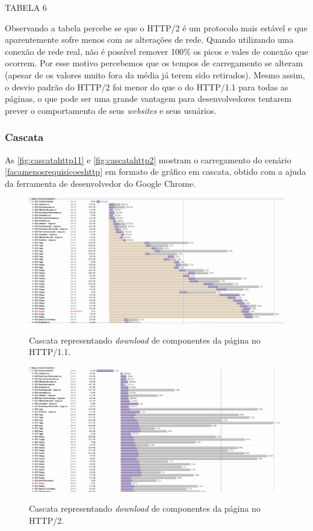 TABELA 6

Observando a tabela percebe se que o HTTP/2 é um protocolo mais estável e que aparentemente sofre menos com as alterações de rede. Quando utilizando uma conexão de rede real, não é possível remover 100\% os picos e vales de conexão que ocorrem. Por esse motivo percebemos que os tempos de carregamento se alteram (apesar de os valores muito fora da média já terem sido retirados). Mesmo assim, o desvio padrão do HTTP/2 foi menor do que o do HTTP/1.1 para todas as páginas, o que pode ser uma grande vantagem para desenvolvedores tentarem prever o comportamento de seus \textit{websites} e seus usuários.

\subsubsection{Cascata}
\label{cascata}

As \autoref{fig:cascatahttp11} e \autoref{fig:cascatahttp2} mostram o carregamento do cenário \autoref{facamenosrequisicoeshttp} em formato de gráfico em cascata, obtido com a ajuda da ferramenta de desenvolvedor do Google Chrome.

\begin{figure}[!htb]
    \centering
    \caption{Cascata representando \textit{download} de componentes da página no HTTP/1.1.}
    \includegraphics[width=1.0\textwidth]{./04-figuras/analise-de-resultados/cascata_http11}
    \label{fig:cascatahttp11}
\end{figure}

\begin{figure}[!htb]
    \centering
    \caption{Cascata representando \textit{download} de componentes da página no HTTP/2.}
    \includegraphics[width=1.0\textwidth]{./04-figuras/analise-de-resultados/cascata_http2}
    \label{fig:cascatahttp2}
\end{figure}

